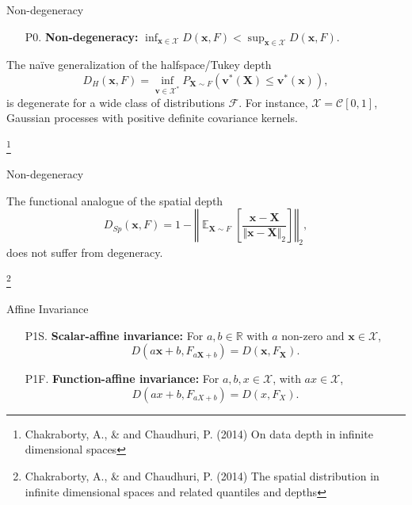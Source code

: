 \documentclass[handout, notes]{beamer}
\newcommand{\R}{\mathbb{R}}
\newcommand{\vx}{\bm{x}}
\newcommand{\vX}{\bm{X}}
\newcommand{\vv}{\bm{v}}
\DeclareMathOperator{\E}{\mathbb{E}}
\newcommand{\norm}[1]{\Vert #1 \Vert}
\newcommand\blfootnote[1]{%
  \begingroup
  \renewcommand\thefootnote{}\footnote{#1}%
  \addtocounter{footnote}{-1}%
  \endgroup
}
\begin{document}
    \begin{frame}{Non-degeneracy}
        \begin{enumerate}
            \item[P0.] \textbf{Non-degeneracy:} $\inf_{\vx \in \mathscr{X}} D(\vx, F) < \sup_{\vx \in \mathscr{X}} D(\vx, F)$.
        \end{enumerate}

        The na\"ive generalization of the halfspace/Tukey depth \[
            D_H(\vx, F) = \inf_{\vv \in \mathscr{X}^*} P_{\vX \sim F}(\vv^*(\vX) \leq \vv^*(\vx)),
        \] is degenerate for a wide class of distributions $\mathscr{F}$.
        For instance, $\mathscr{X} = \mathcal{C}[0, 1]$, Gaussian processes with
        positive definite covariance kernels.

        \blfootnote{
            Chakraborty, A., \& and Chaudhuri, P. (2014) On data depth in
            infinite dimensional spaces
        }
    \end{frame}


    \begin{frame}{Non-degeneracy}

        The functional analogue of the spatial depth \[
            D_{Sp}(\vx, F) = 1 - \left\Vert\E_{\vX \sim F}\left[\frac{\vx - \vX}{\norm{\vx - \vX}_2}\right]\right\Vert_2,
        \] does not suffer from degeneracy.


        \blfootnote{
            Chakraborty, A., \& and Chaudhuri, P. (2014) The spatial
            distribution in infinite dimensional spaces and related quantiles
            and depths
        }
    \end{frame}


    \begin{frame}{Affine Invariance}
        \begin{enumerate}
            \item[P1S.] \textbf{Scalar-affine invariance:} For $a, b \in \R$
            with $a$ non-zero and $\vx \in \mathscr{X}$, \[
                D(a\vx + b, F_{a\vX + b}) = D(\vx, F_{\vX}).
            \]
            \item[P1F.] \textbf{Function-affine invariance:} For $a, b, x \in
            \mathscr{X}$, with $ax \in \mathscr{X}$, \[
                D(ax + b, F_{aX + b}) = D(x, F_{X}).
            \]
        \end{enumerate}
    \end{frame}
\end{document}
